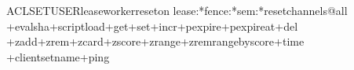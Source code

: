 ACLSETUSERlease\PGZhy{}workerreseton\PGZgt{}
\PGZti{}lease:*\PGZti{}fence:*\PGZti{}sem:*resetchannels\PGZhy{}@all
+evalsha+scriptload+get+set+incr+pexpire+pexpireat+del
+zadd+zrem+zcard+zscore+zrange+zremrangebyscore+time
+clientsetname+ping

